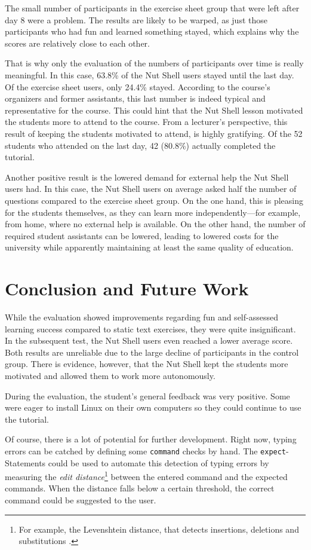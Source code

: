 \documentclass[paper=a4,twoside,abstract=on,cleardoublepage=empty,numbers=noenddot,toc=bib,12pt,appendixprefix=true]{scrreprt}
\begin{document}
The small number of participants in the exercise sheet group that were left after day 8 were a problem. The results are likely to be warped, as just those participants who had fun and learned something stayed, which explains why the scores are relatively close to each other.

That is why only the evaluation of the numbers of participants over time is really meaningful. In this case, 63.8\% of the Nut Shell users stayed until the last day. Of the exercise sheet users, only 24.4\% stayed. According to the course's organizers and former assistants, this last number is indeed typical and representative for the course. This could hint that the Nut Shell lesson motivated the students more to attend to the course. From a lecturer's perspective, this result of keeping the students motivated to attend, is highly gratifying. Of the 52 students who attended on the last day, 42 (80.8\%) actually completed the tutorial.

Another positive result is the lowered demand for external help the Nut Shell users had. In this case, the Nut Shell users on average asked half the number of questions compared to the exercise sheet group. On the one hand, this is pleasing for the students themselves, as they can learn more independently---for example, from home, where no external help is available. On the other hand, the number of required student assistants can be lowered, leading to lowered costs for the university while apparently maintaining at least the same quality of education.

\chapter{Conclusion and Future Work}

While the evaluation showed improvements regarding fun and self-assessed learning success compared to static text exercises, they were quite insignificant. In the subsequent test, the Nut Shell users even reached a lower average score. Both results are unreliable due to the large decline of participants in the control group. There is evidence, however, that the Nut Shell kept the students more motivated and allowed them to work more autonomously.

During the evaluation, the student's general feedback was very positive. Some were eager to install Linux on their own computers so they could continue to use the tutorial.

Of course, there is a lot of potential for further development. Right now, typing errors can be catched by defining some \texttt{command} checks by hand. The \texttt{expect}-Statements could be used to automate this detection of typing errors by measuring the \emph{edit distance}\footnote{For example, the Levenshtein distance, that detects insertions, deletions and substitutions \cite{levenshtein66}.} between the entered command and the expected commands. When the distance falls below a certain threshold, the correct command could be suggested to the user.
\end{document}
